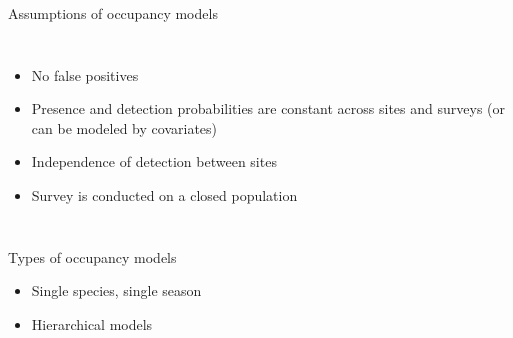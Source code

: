 \documentclass{beamer}
\begin{document}
\begin{frame}{Assumptions of occupancy models}
	\begin{columns}
		\column{5cm}
		\begin{itemize}
			\item No false positives
			\item Presence and detection probabilities are constant across sites
			and surveys (or can be modeled by covariates)
			\item Independence of detection between sites
			\item Survey is conducted on a closed population
		\end{itemize}
		\column{5cm}
	\end{columns}
\end{frame}

\begin{frame}{Types of occupancy models}
	\begin{itemize}
		\item Single species, single season
		\item Hierarchical models
	\end{itemize}
	\begin{center}
	\end{center}
\end{frame}
\end{document}
